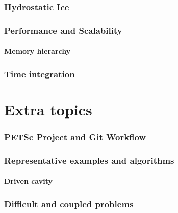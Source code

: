 \documentclass{beamer}
\begin{document}
\section{Hydrostatic Ice}


\section{Performance and Scalability}



\subsection{Memory hierarchy}






%

\section{Time integration}






\part{Extra topics}


\section{PETSc Project and Git Workflow}

\section{Representative examples and algorithms}
\subsection{Driven cavity}



\section{Difficult and coupled problems}





\end{document}
